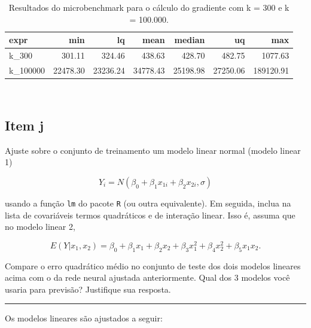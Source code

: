 \documentclass[
  a4paperpaper,
]{article}
\begin{document}
\begin{longtable}[]{@{}lrrrrrr@{}}

\caption{\label{tbl-microbenchmark}Resultados do microbenchmark para o
cálculo do gradiente com k = 300 e k = 100.000.}

\tabularnewline

\toprule\noalign{}
expr & min & lq & mean & median & uq & max \\
\midrule\noalign{}
\endhead
\bottomrule\noalign{}
\endlastfoot
k\_300 & 301.11 & 324.46 & 438.63 & 428.70 & 482.75 & 1077.63 \\
k\_100000 & 22478.30 & 23236.24 & 34778.43 & 25198.98 & 27250.06 &
189120.91 \\

\end{longtable}

~

\subsection{Item j}\label{item-j}

Ajuste sobre o conjunto de treinamento um modelo linear normal (modelo
linear 1)

\[
Y_i = N \left(\beta_0 + \beta_1 x_{1i} + \beta_2 x_{2i}, \sigma \right)
\]

usando a função \texttt{lm} do pacote \texttt{R} (ou outra equivalente).
Em seguida, inclua na lista de covariáveis termos quadráticos e de
interação linear. Isso é, assuma que no modelo linear 2,

\[
E(Y|x_1, x_2) = \beta_0 + \beta_1 x_{1} + \beta_2 x_{2} + \beta_3 x_1^2 + \beta_4 x_2^2 + \beta_5 x_1 x_2.
\]

Compare o erro quadrático médio no conjunto de teste dos dois modelos
lineares acima com o da rede neural ajustada anteriormente. Qual dos 3
modelos você usaria para previsão? Justifique sua resposta.

\begin{center}\rule{0.5\linewidth}{0.5pt}\end{center}

Os modelos lineares são ajustados a seguir:
\end{document}
